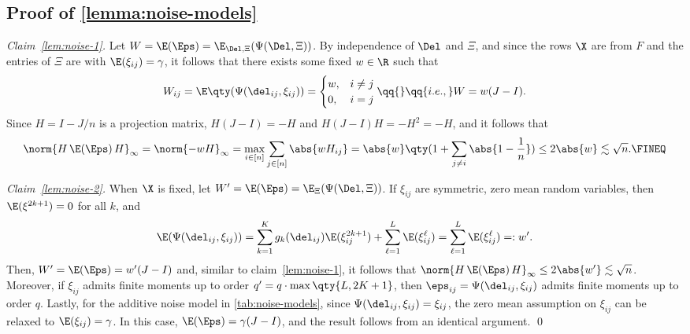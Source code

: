 \documentclass[10pt]{article}
\begin{document}


\subsection{Proof of \cref{lemma:noise-models}}
\label{proof:lemma:noise-models}


\textit{Claim~\ref{lem:noise-1}.} Let $W = \E(\Eps) = \E_{\Del, \Xi}( \Psi(\Del, \Xi) )$. By independence of $\Del$ and $\Xi$, and since the rows $\X$ are \iid{} from $F$ and the entries of $\Xi$ are \iid{} with $\E(\xi_{ij}) = \gamma$, it follows that there exists some fixed $w \in \R$ such that
\begin{align}\label{eq:Expectation-Eps}
    W_{ij} = \E\qty(\Psi(\del_{ij}, \xi_{ij})) = \begin{cases}
        w, & i \neq j\\
        0, & i = j
    \end{cases}
    \qq{}\qq{i.e.,} W = w(J-I).
\end{align}
Since $H = I - J/n$ is a projection matrix, $H(J-I) = -H$ and $H(J-I)H = -H^2 = -H$, and it follows that
\begin{align}
    \norm{H \,\E(\Eps) \, H}_\infty = \norm{-w H}_\infty = \max_{i \in [n]}\sum_{j \in [n]} \abs{w H_{ij}} = \abs{w} \qty(1 + \sum_{j \neq i}\abs{1 - \frac{1}{n}}) \le 2\abs{w} \lesssim \sqrt{n}.\FINEQ
\end{align}

\noindent\textit{Claim~\ref{lem:noise-2}.} When $\X$ is fixed, let $W' = \E(\Eps) = \E_{\Xi}(\Psi(\Del, \Xi))$. If $\xi_{ij}$ are \iid{} symmetric, zero mean random variables, then $\E(\xi^{2k+1}) = 0$ for all $k$, and
\begin{align}
    \E(\Psi(\del_{ij}, \xi_{ij})) = \sum_{k=1}^K g_k(\del_{ij})\E(\xi_{ij}^{2k+1}) + \sum_{\ell=1}^{L} \E(\xi_{ij}^{\ell}) = \sum_{\ell=1}^{L} \E(\xi_{ij}^{\ell}) =: w'.
\end{align}
Then, $W' = \E(\Eps) = w'(J-I)$ and, similar to claim~\ref{lem:noise-1}, it follows that $\norm{H \,\E(\Eps) \, H}_\infty \le 2\abs{w'} \lesssim \sqrt{n}$. Moreover, if $\xi_{ij}$ admits finite moments up to order $q' = q \cdot \max\qty{L, 2K+1}$, then $\eps_{ij} = \Psi(\del_{ij}, \xi_{ij})$ admits finite moments up to order $q$. Lastly, for the additive noise model in \cref{tab:noise-models}, since $\Psi(\del_{ij}, \xi_{ij}) = \xi_{ij}$, the zero mean assumption on $\xi_{ij}$ can be relaxed to $\E(\xi_{ij}) = \gamma$. In this case, $\E(\Eps) = \gamma(J-I)$, and the result follows from an identical argument. \qed
\end{document}
